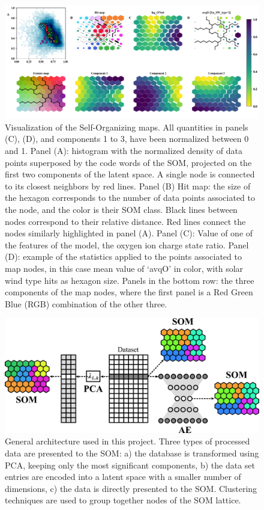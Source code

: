 \documentclass[utf8]{frontiersSCNS} %
\begin{document}
\begin{figure}[h!]
	\begin{center}
		\includegraphics[width=18cm]{maps}%
	\end{center}
	\caption{Visualization of the Self-Organizing maps. All quantities in panels (C), (D), and components 1 to 3, have been normalized between 0 and 1. Panel (A): histogram with the normalized density of data points superposed by the code words of the SOM, projected on the first two components of the latent space. A single node is connected to its closest neighbors by red lines. Panel (B) Hit map: the size of the hexagon corresponds to the number of data points associated to the node, and the color is their SOM class. Black lines between nodes correspond to their relative distance. Red lines connect the nodes similarly highlighted in panel (A). Panel (C): Value of one of the features of the model, the oxygen ion charge state ratio. Panel (D): example of the statistics applied to the points associated to map nodes, in this case mean value of `avqO' in color, with solar wind type hits as hexagon size. Panels in the bottom row: the three components of the map nodes, where the first panel is a Red Green Blue (RGB) combination of the other three.}\label{fig:maps}
\end{figure}

\begin{figure}[h!]
	\begin{center}
		\includegraphics[width=12cm]{architecture}%
	\end{center}
	\caption{General architecture used in this project. Three types of processed data are presented to the SOM: a) the database is transformed using PCA, keeping only the most significant components, b) the data set entries are encoded into a latent space with a smaller number of dimensions, c) the data is directly presented to the SOM. Clustering techniques are used to group together nodes of the SOM lattice.}\label{fig:architecture}
\end{figure}
\end{document}
